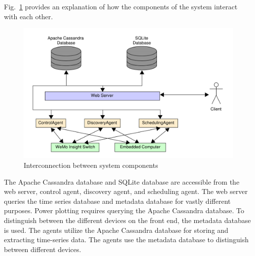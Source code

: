 \documentclass[conference]{IEEEtran}
\begin{document}
Fig.~\ref{fig:systemComponentInterconnection} provides an explanation of how
the components of the system interact with each other. %
%
\begin{figure}
  \centering
  \includegraphics[scale=0.3]{figs/overallDiagram.pdf}
  \caption{Interconnection between system components}
  \label{fig:systemComponentInterconnection}
\end{figure}
%
The Apache Cassandra database and SQLite database are accessible from the web server, control agent, discovery agent, and scheduling agent. The web server queries the time series database and metadata database for vastly different purposes. Power plotting requires querying the Apache Cassandra database. To distinguish between the different devices on the front end, the metadata database is used. The agents utilize the Apache Cassandra database for storing and extracting time-series data. The agents use the metadata database to distinguish between different devices. 
\end{document}
